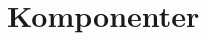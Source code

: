\section{Komponenter}
\label{sec:komponenter}


\begin{figure}
  \centering
  \scalebox{0.7}{
    
  }
\end{figure}
